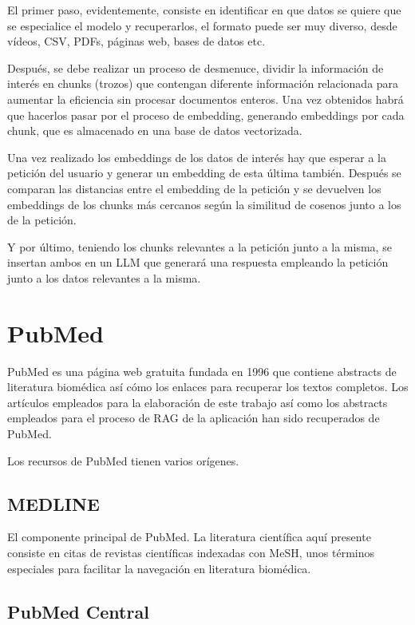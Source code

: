 El primer paso, evidentemente, consiste en identificar en que datos se quiere que se especialice el modelo y recuperarlos, el formato puede ser muy diverso, desde vídeos, CSV, PDFs, páginas web, bases de datos etc.

Después, se debe realizar un proceso de desmenuce, dividir la información de interés en chunks (trozos) que contengan diferente información relacionada para aumentar la eficiencia sin procesar documentos enteros. Una vez obtenidos habrá que hacerlos pasar por el proceso de embedding, generando embeddings por cada chunk, que es almacenado en una base de datos vectorizada.

Una vez realizado los embeddings de los datos de interés hay que esperar a la petición del usuario y generar un embedding de esta última también. Después se comparan las distancias entre el embedding de la petición y se devuelven los embeddings de los chunks más cercanos según la similitud de cosenos junto a los de la petición.

Y por último, teniendo los chunks relevantes a la petición junto a la misma, se insertan ambos en un LLM que generará una respuesta empleando la petición junto a los datos relevantes a la misma.

\section{PubMed}

PubMed es una página web gratuita fundada en 1996 que contiene abstracts de  literatura biomédica así cómo los enlaces para recuperar los textos completos. Los artículos empleados para la elaboración de este trabajo así como los abstracts empleados para el proceso de RAG de la aplicación han sido recuperados de PubMed.

Los recursos de PubMed tienen varios orígenes.

\subsection{MEDLINE}

El componente principal de PubMed. La literatura científica aquí presente consiste en citas de revistas científicas indexadas con MeSH, unos términos especiales para facilitar la navegación en literatura biomédica.

\subsection{PubMed Central}

